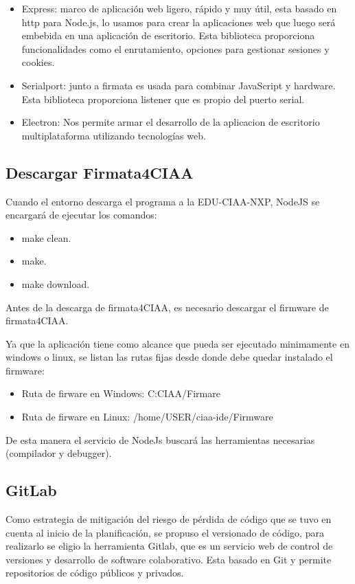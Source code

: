 \begin{itemize}
	\item Express\citep{express}:  marco de aplicación web ligero, rápido y muy útil, esta basado en http para Node.js, lo usamos para crear la aplicaciones web que luego será embebida en una aplicación de escritorio. Esta biblioteca  proporciona funcionalidades como el enrutamiento, opciones para gestionar sesiones y cookies.
	
	\item Serialport\citep{serialport}: junto a firmata es usada para combinar JavaScript y hardware. Esta biblioteca proporciona listener que es propio del puerto serial.
	
	\item Electron\citep{electron}: Nos permite armar el desarrollo de la aplicacion de escritorio multiplataforma utilizando tecnologías web.
\end{itemize}

\subsection{Descargar Firmata4CIAA}
\label{subsec:Descargar Firmata4CIAA}

Cuando el entorno descarga el programa a la EDU-CIAA-NXP, NodeJS se encargará de ejecutar los comandos:
\begin{itemize}
	\item make clean.
	\item make.	
	\item make download.		
\end{itemize}

Antes de la descarga de firmata4CIAA, es necesario descargar el firmware de firmata4CIAA.

Ya que la aplicación tiene como alcance que pueda ser ejecutado minimamente en 
windows o linux, se listan las rutas fijas desde donde debe quedar instalado el firmware:

\begin{itemize}
	\item Ruta de firware en Windows: C:CIAA/Firmare
	\item Ruta de firware en Linux: /home/USER/ciaa-ide/Firmware		
\end{itemize}

De esta manera el servicio de NodeJs buscará las herramientas necesarias (compilador y debugger). 


\subsection{GitLab}
\label{subsec:GitLab}

Como estrategia de mitigación del riesgo de pérdida de código que se tuvo en cuenta al inicio de la planificación, se propuso el versionado de código, para realizarlo se eligio la herramienta Gitlab, que es un servicio web de control de versiones y desarrollo de software colaborativo. Esta basado en Git y permite repositorios de código públicos y privados. 

